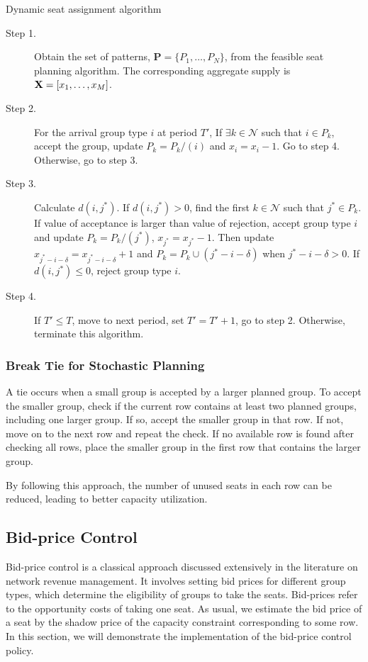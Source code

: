 \begin{algorithm}[H]
  \caption{Dynamic seat assignment algorithm}\label{algo_dynamic_policy}
  \begin{description}
    \item[Step 1.] Obtain the set of patterns, $\mathbf{P} = \{P_1,\ldots,P_{N}\}$, from the feasible seat planning algorithm. The corresponding aggregate supply is $\mathbf{X} = [x_{1}, \ldots, x_{M}]$.
    \item[Step 2.] For the arrival group type $i$ at period $T{'}$, 
    If $\exists k \in \mathcal{N}$ such that $i \in P_k$, accept the group, update $P_{k} = P_{k}/(i)$ and $x_{i} = x_{i} -1$. Go to step 4. Otherwise, go to step 3.
    \item[Step 3.] Calculate $d(i,j^{*})$. If $d(i,j^{*})>0$, find the first $k \in \mathcal{N}$ such that $j^{*} \in P_k$. If value of acceptance is larger than value of rejection, accept group type $i$ and update $P_{k} = P_{k}/(j^{*})$, $x_{j^{*}} = x_{j^{*}} -1$. Then update $x_{j^{*}-i-\delta} = x_{j^{*}-i-\delta} + 1$ and $P_{k}= P_{k} \cup (j^{*}-i-\delta)$ when $j^{*}-i-\delta > 0$. If $d(i,j^{*}) \leq 0$, reject group type $i$.
    \item[Step 4.] If $T{'} \leq T$, move to next period, set $T{'} = T{'}+1$, go to step 2. Otherwise, terminate this algorithm.
  \end{description}
\end{algorithm}

\subsubsection{Break Tie for Stochastic Planning}
A tie occurs when a small group is accepted by a larger planned group. To accept the smaller group, check if the current row contains at least two planned groups, including one larger group. If so, accept the smaller group in that row. If not, move on to the next row and repeat the check. If no available row is found after checking all rows, place the smaller group in the first row that contains the larger group.

By following this approach, the number of unused seats in each row can be reduced, leading to better capacity utilization.

\subsection{Bid-price Control}
Bid-price control is a classical approach discussed extensively in the literature on network revenue management. It involves setting bid prices for different group types, which determine the eligibility of groups to take the seats. Bid-prices refer to the opportunity costs of taking one seat. As usual, we estimate the bid price of a seat by the shadow price of the capacity constraint corresponding to some row. In this section, we will demonstrate the implementation of the bid-price control policy. 

